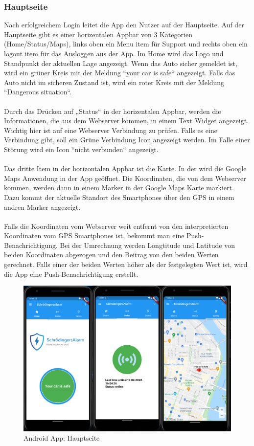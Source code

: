 \subsubsection{Hauptseite}
Nach erfolgreichem Login leitet die App den Nutzer auf der Hauptseite.
Auf der Hauptseite gibt es einer horizentalen Appbar von 3 Kategorien (Home/Status/Maps), links oben ein Menu item für Support und rechts oben ein logout item für das Ausloggen aus der App. 
Im Home wird das Logo und Standpunkt der aktuellen Lage angezeigt.
Wenn das Auto sicher gemeldet ist, wird ein grüner Kreis mit der Meldung “your car is safe“ angezeigt. 
Falls das Auto nicht im sicheren Zustand ist, wird ein roter Kreis mit der Meldung “Dangerous situation“.\\\\
Durch das Drücken auf „Status“ in der horizentalen Appbar, werden die Informationen, die aus dem Webserver kommen, in einem Text Widget angezeigt.
Wichtig hier ist auf eine Webserver Verbindung zu prüfen. Falls es eine Verbindung gibt, soll ein Grüne Verbindung Icon angezeigt werden.
Im Falle einer Störung wird ein Icon “nicht verbunden“ angezeigt.\\\\
Das dritte Item in der horizontalen Appbar ist die Karte. In der wird die Google Maps Anwendung in der App geöffnet.
Die Koordinaten, die von dem Webserver kommen, werden dann in einem Marker in der Google Maps Karte markiert. 
Dazu kommt der aktuelle Standort des Smartphones über den GPS in einem andren Marker angezeigt.\\\\
Falls die Koordinaten vom Webserver weit entfernt von den interpretierten Koordinaten vom GPS Smartphones ist, bekommt man eine Push-Benachrichtigung. Bei der Umrechnung werden Longtitude und Latitude von beiden Koordinaten abgezogen und den Beitrag von den beiden Werten gerechnet. 
Falls einer der beiden Werten höher als der festgelegten Wert ist, wird die App eine Push-Benachrichtigung erstellt.
 	\begin{figure}[H]
   \centering
            \includegraphics[width=1\textwidth]{Bilder/hauptseite.PNG}
		            \caption{Android App: Hauptseite}
    \end{figure}
